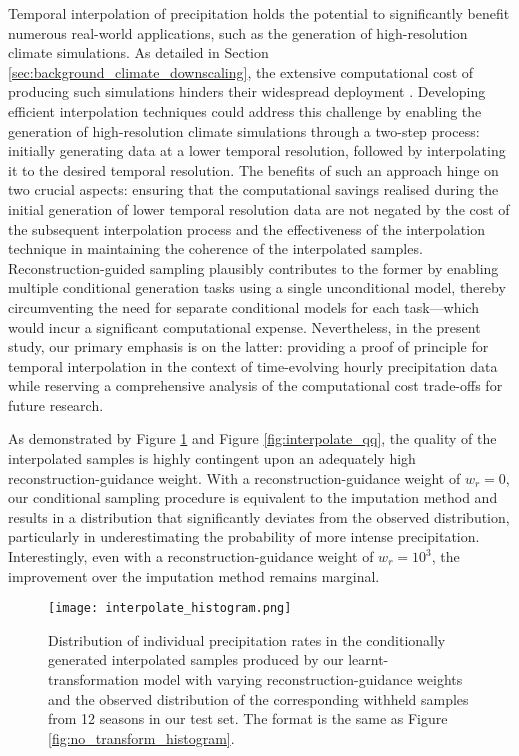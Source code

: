 \documentclass[ oneside,%
                    author={George Herbert},
                    degree={MSci},
                     title={Diffusion Models for Time-Evolving Precipitation Fields},
                  subtitle={}]{dissertation}
\begin{document}
Temporal interpolation of precipitation holds the potential to significantly benefit numerous real-world applications, such as the generation of high-resolution climate simulations. As detailed in Section \ref{sec:background_climate_downscaling}, the extensive computational cost of producing such simulations hinders their widespread deployment \cite{MO_CPM}. Developing efficient interpolation techniques could address this challenge by enabling the generation of high-resolution climate simulations through a two-step process: initially generating data at a lower temporal resolution, followed by interpolating it to the desired temporal resolution. The benefits of such an approach hinge on two crucial aspects: ensuring that the computational savings realised during the initial generation of lower temporal resolution data are not negated by the cost of the subsequent interpolation process and the effectiveness of the interpolation technique in maintaining the coherence of the interpolated samples. Reconstruction-guided sampling plausibly contributes to the former by enabling multiple conditional generation tasks using a single unconditional model, thereby circumventing the need for separate conditional models for each task---which would incur a significant computational expense. Nevertheless, in the present study, our primary emphasis is on the latter: providing a proof of principle for temporal interpolation in the context of time-evolving hourly precipitation data while reserving a comprehensive analysis of the computational cost trade-offs for future research.

As demonstrated by Figure \ref{fig:interpolate_histogram} and Figure \ref{fig:interpolate_qq}, the quality of the interpolated samples is highly contingent upon an adequately high reconstruction-guidance weight. With a reconstruction-guidance weight of $w_r=0$, our conditional sampling procedure is equivalent to the imputation method \cite{Score_Based_Song} and results in a distribution that significantly deviates from the observed distribution, particularly in underestimating the probability of more intense precipitation. Interestingly, even with a reconstruction-guidance weight of $w_r=10^3$, the improvement over the imputation method remains marginal.

\begin{figure}[htbp]
      \centering
      \texttt{[image: interpolate\_histogram.png]}
      \caption{Distribution of individual precipitation rates in the conditionally generated interpolated samples produced by our learnt-transformation model with varying reconstruction-guidance weights and the observed distribution of the corresponding withheld samples from 12 seasons in our test set. The format is the same as Figure \ref{fig:no_transform_histogram}.}
      \label{fig:interpolate_histogram}
\end{figure}
\end{document}
